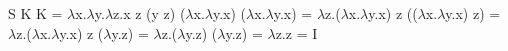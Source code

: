 \documentclass{article}
\begin{document}
S K K = $\lambda$x.$\lambda$y.$\lambda$z.x z (y z) ($\lambda$x.$\lambda$y.x) ($\lambda$x.$\lambda$y.x) = $\lambda$z.($\lambda$x.$\lambda$y.x) z (($\lambda$x.$\lambda$y.x) z) = $\lambda$z.($\lambda$x.$\lambda$y.x) z ($\lambda$y.z) = $\lambda$z.($\lambda$y.z) ($\lambda$y.z) = $\lambda$z.z = I
\end{document}
